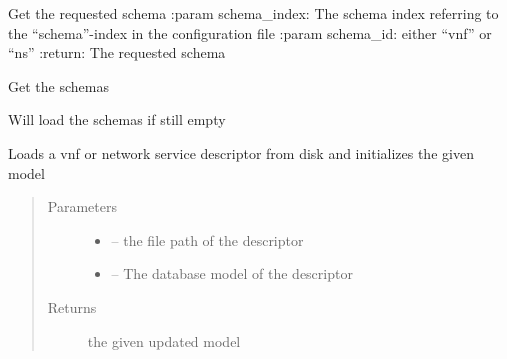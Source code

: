 \documentclass[letterpaper,10pt,english]{sphinxmanual}
\begin{document}

\begin{fulllineitems}
\label{_source/son_editor.util:son_editor.util.descriptorutil.get_schema}
Get the requested schema
:param schema\_index: The schema index referring to the ``schema''-index in the configuration file
:param schema\_id: either ``vnf'' or ``ns''
:return: The requested schema

\end{fulllineitems}


\begin{fulllineitems}
\label{_source/son_editor.util:son_editor.util.descriptorutil.get_schemas}
Get the schemas

Will load the schemas if still empty

\end{fulllineitems}


\begin{fulllineitems}
\label{_source/son_editor.util:son_editor.util.descriptorutil.load_ns_vnf_from_disk}
Loads a vnf or network service descriptor from disk and initializes the given model
\begin{quote}\begin{description}
\item[{Parameters}] \leavevmode\begin{itemize}
\item {} 
 -- the file path of the descriptor

\item {} 
 -- The database  model of the descriptor

\end{itemize}

\item[{Returns}] \leavevmode
the given updated model

\end{description}\end{quote}

\end{fulllineitems}
\end{document}
